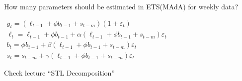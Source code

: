 
\begin{question}
How many parameters should be estimated in ETS(MAdA) for weekly data?

\(\begin{array}{l}{{y_{t}=(\ell_{t-1}+\phi b_{t-1}+s_{t-m})(1+\varepsilon_{t})}}\\ {{\ell_{t}=\ell_{t-1}+\phi b_{t-1}+\alpha(\ell_{t-1}+\phi b_{t-1}+s_{t-m})\varepsilon_{t}}}\\ {{b_{t}=\phi b_{t-1}+\beta(\ell_{t-1}+\phi b_{t-1}+s_{t-m})\varepsilon_{t}}}\\ {{s_{t}=s_{t-m}+\gamma(\ell_{t-1}+\phi b_{t-1}+s_{t-m})\varepsilon_{t}}}\end{array}\)
\end{question}

\begin{solution}
Check lecture ``STL Decomposition''
\end{solution}


